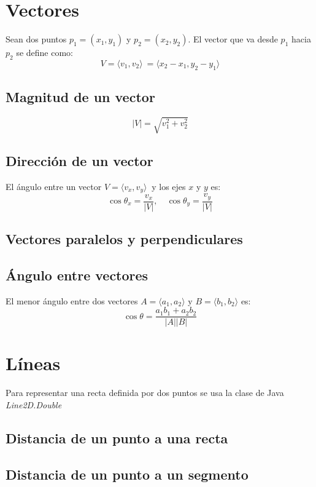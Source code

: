 \documentclass{article}
\begin{document}
\begin{multicols}{2}
\section{Vectores}
Sean dos puntos \( p_1 = (x_1, y_1) \) y \( p_2 = (x_2, y_2) \). El vector que va desde \( p_1 \) hacia \( p_2 \) se define como:
\[ V = \langle v_1, v_2 \rangle \ = \langle x_2 - x_1, y_2 - y_1 \rangle \]

\subsection{Magnitud de un vector}
\[ |V| = \sqrt{v_1^2 + v_2^2} \]

\subsection{Dirección de un vector}
El ángulo entre un vector \( V = \langle v_x, v_y \rangle \ \) y los ejes \( x \) y \( y \) es:
\[ \cos \theta_x = \frac{v_x}{|V|}, \quad \cos \theta_y = \frac{v_y}{|V|} \]

\subsection{Vectores paralelos y perpendiculares}


\subsection{Ángulo entre vectores}
El menor ángulo entre dos vectores \( A = \langle a_1, a_2 \rangle \) y \( B = \langle b_1, b_2 \rangle \) es:
\[ \cos \theta = \frac{a_1 b_1 + a_2 b_2}{|A| |B|} \]


\section{Líneas}
Para representar una recta definida por dos puntos se usa la clase de Java \emph{Line2D.Double}


\subsection{Distancia de un punto a una recta}


\subsection{Distancia de un punto a un segmento}



\end{multicols}
\end{document}
